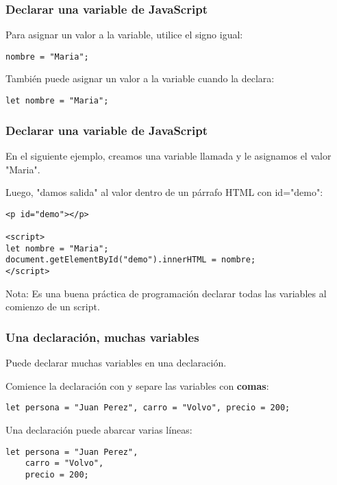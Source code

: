 \begin{frame}[fragile]
  \frametitle{Declarar una variable de JavaScript}
  Para asignar un valor a la variable, utilice el signo igual:
  \vspace{\baselineskip}
  \begin{lstlisting}
nombre = "Maria";
  \end{lstlisting}

  \vspace{\baselineskip}
  También puede asignar un valor a la variable cuando la declara:

  \vspace{\baselineskip}
  \begin{lstlisting}
let nombre = "Maria";
  \end{lstlisting}
\end{frame}

\begin{frame}[fragile]
  \frametitle{Declarar una variable de JavaScript}

  En el siguiente ejemplo, creamos una variable llamada
   y le asignamos el valor "Maria".

  \vspace{\baselineskip}
  Luego, "damos salida" al valor dentro de un párrafo HTML con id="demo":

  \vspace{\baselineskip}
  \begin{lstlisting}
<p id="demo"></p>

<script>
let nombre = "Maria";
document.getElementById("demo").innerHTML = nombre;
</script> 
  \end{lstlisting}

  \begin{exampleblock}{Nota:}
    Es una buena práctica de programación declarar todas
    las variables al comienzo de un script.
  \end{exampleblock}
\end{frame}

\begin{frame}[fragile]
  \frametitle{Una declaración, muchas variables}

  Puede declarar muchas variables en una declaración.

  \vspace{\baselineskip}
  Comience la declaración con  y separe las variables
  con \textbf{comas}:

  \vspace{\baselineskip}
  \begin{lstlisting}
let persona = "Juan Perez", carro = "Volvo", precio = 200; 
  \end{lstlisting}

  \vspace{\baselineskip}
  Una declaración puede abarcar varias líneas:

  \vspace{\baselineskip}
  \begin{lstlisting}
let persona = "Juan Perez",
    carro = "Volvo",
    precio = 200; 
  \end{lstlisting}
\end{frame}


